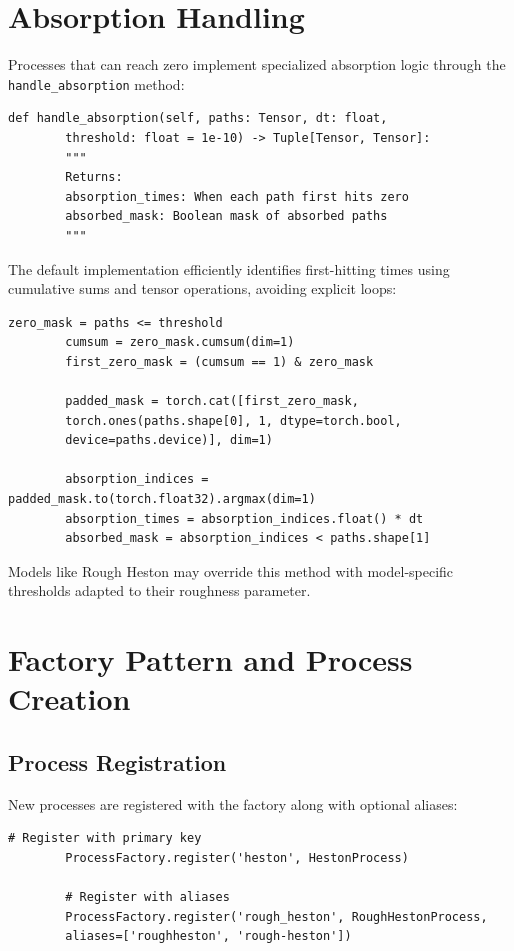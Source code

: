	\section{Absorption Handling}
	
	Processes that can reach zero implement specialized absorption logic through the \texttt{handle\_absorption} method:
	
	\begin{lstlisting}[style=cleanpy]
		def handle_absorption(self, paths: Tensor, dt: float,
		threshold: float = 1e-10) -> Tuple[Tensor, Tensor]:
		"""
		Returns:
		absorption_times: When each path first hits zero
		absorbed_mask: Boolean mask of absorbed paths
		"""
	\end{lstlisting}
	
	The default implementation efficiently identifies first-hitting times using cumulative sums and tensor operations, avoiding explicit loops:
	
	\begin{lstlisting}[style=cleanpy]
		zero_mask = paths <= threshold
		cumsum = zero_mask.cumsum(dim=1)
		first_zero_mask = (cumsum == 1) & zero_mask
		
		padded_mask = torch.cat([first_zero_mask, 
		torch.ones(paths.shape[0], 1, dtype=torch.bool, 
		device=paths.device)], dim=1)
		
		absorption_indices = padded_mask.to(torch.float32).argmax(dim=1)
		absorption_times = absorption_indices.float() * dt
		absorbed_mask = absorption_indices < paths.shape[1]
	\end{lstlisting}
	
	Models like Rough Heston may override this method with model-specific thresholds adapted to their roughness parameter.
	
	\section{Factory Pattern and Process Creation}
	
	\subsection{Process Registration}
	New processes are registered with the factory along with optional aliases:
	
	\begin{lstlisting}[style=cleanpy]
		# Register with primary key
		ProcessFactory.register('heston', HestonProcess)
		
		# Register with aliases
		ProcessFactory.register('rough_heston', RoughHestonProcess,
		aliases=['roughheston', 'rough-heston'])
	\end{lstlisting}
	
